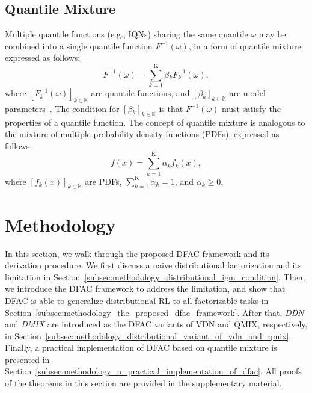 \documentclass{article}
\newcommand{\agentspace}{\mathbb{K}}
\newcommand{\agentcounter}{k}
\newcommand{\numberofagents}{\mathrm{K}}
\newcommand{\quantilefunction}{F^{-1}}
\newcommand{\quantile}{\omega}
\newcommand{\pdf}{f}
\newcommand{\pdfmodelparameter}{\alpha}
\newcommand{\modelparameter}{\beta}
\newcommand{\ddn}{\textit{DDN}}
\newcommand{\dmix}{\textit{DMIX}}
\begin{document}
\subsection{Quantile Mixture}
\label{subsec:background_quantile_mixture}

Multiple quantile functions (e.g., IQNs) sharing the same quantile $\quantile{}$ may be combined into a single quantile function $\quantilefunction{}(\quantile{})$, in a form of quantile mixture expressed as follows:
\begin{equation}
\quantilefunction{}(\quantile{})=\sum^{\numberofagents{}}_{k=1}\modelparameter{}_{\agentcounter{}} \quantilefunction_{\agentcounter{}}(\quantile{}),
\label{eq:quantile_mixture}
\end{equation}
where $[\quantilefunction_{\agentcounter{}}(\quantile{})]_{\agentcounter{}\in\agentspace{}}$ are quantile functions, and $[\modelparameter{}_{\agentcounter{}}]_{\agentcounter{}\in\agentspace{}}$ are model parameters~\cite{Karvanen2006QuantileMixture}. The condition for  $[\modelparameter{}_{\agentcounter{}}]_{\agentcounter{}\in\agentspace{}}$ is that $\quantilefunction{}(\quantile{})$ must satisfy the properties of a quantile function. The concept of quantile mixture is analogous to the mixture of multiple probability density functions (PDFs), expressed as follows:
\begin{equation}
\pdf{}(x)=\sum^{\numberofagents{}}_{\agentcounter{}=1}\pdfmodelparameter{}_{\agentcounter{}} \pdf{}_{\agentcounter{}}(x),
\end{equation}
where $[\pdf{}_{\agentcounter{}}(x)]_{\agentcounter{}\in\agentspace{}}$ are PDFs, $\sum^{\numberofagents{}}_{\agentcounter{}=1}\pdfmodelparameter{}_{\agentcounter{}}=1$, and $\pdfmodelparameter{}_{\agentcounter{}}\ge 0$.
 \section{Methodology}
\label{sec:methodology}

In this section, we walk through the proposed DFAC framework and its derivation procedure. We first discuss a naive distributional factorization and its limitation in Section~\ref{subsec:methodology_distributional_igm_condition}. Then, we introduce the DFAC framework to address the limitation, and show that DFAC is able to generalize distributional RL to all factorizable tasks in Section~\ref{subsec:methodology_the_proposed_dfac_framework}. After that, \ddn{} and \dmix{} are introduced as the DFAC variants of VDN and QMIX, respectively, in Section~\ref{subsec:methodology_distributional_variant_of_vdn_and_qmix}. Finally, a practical implementation of DFAC based on quantile mixture is presented in Section~\ref{subsec:methodology_a_practical_implementation_of_dfac}. All proofs of the theorems in this section are provided in the supplementary material.
\end{document}
